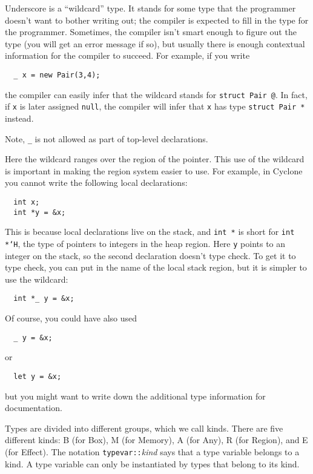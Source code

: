 
Underscore is a ``wildcard'' type.  It stands for some type that the
programmer doesn't want to bother writing out; the compiler is
expected to fill in the type for the programmer.  Sometimes, the
compiler isn't smart enough to figure out the type (you will get an
error message if so), but usually there is enough contextual
information for the compiler to succeed.  For example, if you write
\begin{verbatim}
  _ x = new Pair(3,4);
\end{verbatim}
the compiler can easily infer that the wildcard stands for
\texttt{struct Pair @}.  In fact, if \texttt{x} is later assigned
\texttt{null}, the compiler will infer that \texttt{x} has type
\texttt{struct Pair *} instead.

Note, \texttt{_} is not allowed as part of top-level declarations.


Here the wildcard ranges over the region of the pointer.  This use of
the wildcard is important in making the region system easier to use.
For example, in Cyclone you cannot write the following local declarations:
\begin{verbatim}
  int x;
  int *y = &x;
\end{verbatim}
This is because local declarations live on the stack, and \texttt{int
  *} is short for \texttt{int *`H}, the type of pointers to integers
in the heap region.  Here \texttt{y} points to an integer on the
stack, so the second declaration doesn't type check.  To get it to
type check, you can put in the name of the local stack region, but it
is simpler to use the wildcard:
\begin{verbatim}
  int *_ y = &x;
\end{verbatim}
Of course, you could have also used
\begin{verbatim}
  _ y = &x;
\end{verbatim}
or
\begin{verbatim}
  let y = &x;
\end{verbatim}
but you might want to write down the additional type information for
documentation.


Types are divided into different groups, which we call kinds.  There
are five different kinds: B (for Box), M (for Memory), A (for Any), R
(for Region), and E (for Effect).  The notation
\texttt{typevar}\texttt{::}\textit{kind} says that a type variable
belongs to a kind.  A type variable can only be instantiated by types
that belong to its kind.

